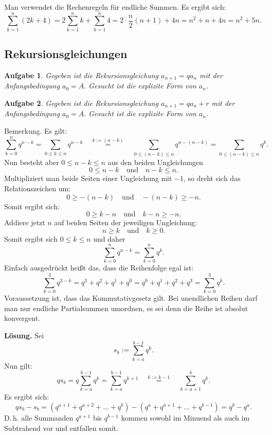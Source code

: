 \documentclass[a4paper,10pt,fleqn,twoside]{scrartcl}
\numberwithin{equation}{section}
\newcommand{\strong}[1]{{\normalfont\sffamily\bfseries #1}}
\theoremstyle{Aufgabe}
\newtheorem{Aufgabe}{\sffamily Aufgabe}[section]
\begin{document}
\noindent\strong{Lösung.}
Man verwendet die Rechenregeln für endliche Summen.
Es ergibt sich:
\begin{equation}
\sum_{k=1}^n (2k+4) = 2\sum_{k=1}^n k + \sum_{k=1}^n 4
= 2\cdot\frac{n}{2}(n+1)+4n = n^2+n+4n = n^2+5n.
\end{equation}

\subsection{Rekursionsgleichungen}

\begin{Aufgabe}\label{qPotenzen}
Gegeben ist die Rekursionsgleichung $a_{n+1} = qa_n$
mit der Anfangsbedingung $a_0=A.$
Gesucht ist die explizite Form von $a_n$.
\end{Aufgabe}

\begin{Aufgabe}
Gegeben ist die Rekursionsgleichung
$a_{n+1} = qa_n+r$
mit der Anfangsbedingung
$a_0=A.$
Gesucht ist die explizite Form von $a_n$.
\end{Aufgabe}

\noindent
Bemerkung. Es gilt:
\[\sum_{k=0}^n q^{n-k} = \sum_{0\le k\le n} q^{n-k}
\quad\stackrel{k:=(n-k)}=\quad\sum_{0\le (n-k)\le n} q^{n-(n-k)}
= \sum_{0\le (n-k)\le n} q^k.
\]
Nun besteht aber $0\le n-k\le n$ aus den beiden Ungleichungen
\[0\le n-k\quad\text{und}\quad n-k\le n.\]
Multipliziert man beide Seiten einer Ungleichung mit $-1$, so dreht
sich das Relationszeichen um:
\[0\ge -(n-k)\quad\text{und}\quad -(n-k)\ge -n.\]
Somit ergibt sich:
\[0\ge k-n\quad\text{und}\quad k-n\ge -n.\]
Addiere jetzt $n$ auf beiden Seiten der jeweiligen Ungleichung:
\[n\ge k\quad\text{und}\quad k\ge 0.\]
Somit ergibt sich $0\le k\le n$ und daher
\[\sum_{k=0}^n q^{n-k} = \sum_{k=0}^n q^k.\]
Einfach ausgedrückt heißt das, dass die Reihenfolge egal ist:
\[\sum_{k=0}^3 q^{3-k} = q^3+q^2+q^1+q^0 = q^0+q^1+q^2+q^3 = \sum_{k=0}^3 q^k.\]
Voraussetzung ist, dass das Kommutativgesetz gilt. Bei unendlichen
Reihen darf man nur endliche Partialsummen umordnen, es sei denn
die Reihe ist absolut konvergent.

\strong{Lösung.} Sei
\[s_b := \sum_{k=a}^{b-1} q^k.\]
Nun gilt:
\[qs_b = q\sum_{k=a}^{b-1} q^k = \sum_{k=a}^{b-1} q^{k+1}
\quad\stackrel{k:=k-1}=\quad\sum_{k=a+1}^b q^k.\]
Es ergibt sich:
\[qs_b-s_b = (q^{a+1}+q^{a+2}+\ldots+q^{b})-(q^a+q^{a+1}+\ldots+q^{b-1}) = q^b-q^a.\]
D.\,h. alle Summanden $q^{a+1}$ bis $q^{b-1}$ kommen sowohl im Minuend als auch im Subtrahend vor und
entfallen somit.
\end{document}
